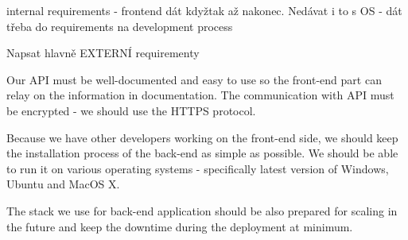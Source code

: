 	internal requirements - frontend dát kdyžtak až nakonec. Nedávat i to s OS - dát třeba do requirements na development process
	
	Napsat hlavně EXTERNÍ requirementy
	
	Our API must be well-documented and easy to use so the front-end part can relay on the information in documentation. The communication with API must be encrypted - we should use the HTTPS protocol. 
	
	Because we have other developers working on the front-end side, we should keep the installation process of the back-end as simple as possible. We should be able to run it on various operating systems - specifically latest version of Windows, Ubuntu and MacOS X.
	
	The stack we use for back-end application should be also prepared for scaling in the future and keep the downtime during the deployment at minimum.